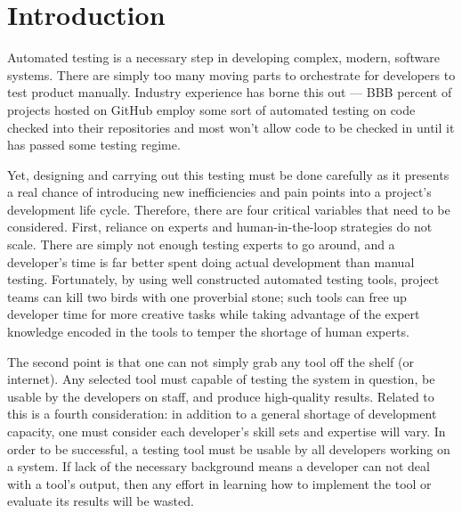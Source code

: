 \section{Introduction}
\label{SEC:introduction}





 Automated testing
is a necessary step in developing complex, modern, software systems.  There
are simply too many moving parts to orchestrate for developers to test
product manually.
Industry experience has borne this out --- BBB percent of projects hosted
on GitHub employ some sort of automated testing on code checked into their
repositories and most won't allow code to be checked in until it has passed
some testing regime.

Yet, designing and carrying out this testing must be done carefully as it
presents a real chance of introducing new inefficiencies and pain points
into a project's development life cycle.  Therefore, there are four
critical variables that need to be considered.
First, reliance on experts and
human-in-the-loop strategies do not scale.  There are
simply not enough testing experts to go around,
and a developer's time is far
better spent doing actual development than manual testing.  Fortunately, by using well constructed automated
testing tools, project teams can kill two birds with one proverbial stone;
such tools can free up developer time for more creative tasks while taking
advantage of the expert knowledge encoded in the tools to temper the
shortage of human experts.


The second point is that one can not simply grab any tool off the shelf (or
internet).  Any selected tool must capable of testing the system in
question, be usable by the developers on staff, and produce
high-quality results.  Related to this is a fourth consideration: in
addition to a general shortage of development capacity, one must consider
each developer's skill sets and expertise will vary.
In order to be successful, a
testing tool must be usable by all developers working on a system. If
lack of the necessary background means a developer can not 
deal with a tool's output,
then any effort in learning how to implement the tool or  evaluate its
results will be wasted.

